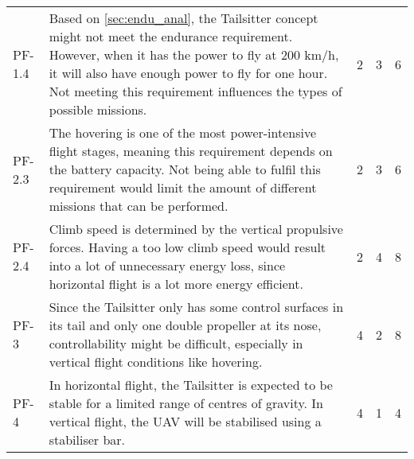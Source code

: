 \begin{table}[]
\begin{tabularx}{\textwidth}{l L l l l}
        \\ \hdashline
        PF-1.4          & Based on \autoref{sec:endu_anal}, the Tailsitter concept might not meet the endurance requirement. However, when it has the power to fly at 200 km/h, it will also have enough power to fly for one hour. Not meeting this requirement influences the types of possible missions.                         & 2     & 3     & 6      
        \\ \hdashline
        PF-2.3          & The hovering is one of the most power-intensive flight stages, meaning this requirement depends on the battery capacity. Not being able to fulfil this requirement would limit the amount of different missions that can be performed.                                                                    & 2       & 3 & 6
        \\ \hdashline
        PF-2.4          & Climb speed is determined by the vertical propulsive forces. Having a too low climb speed would result into a lot of unnecessary energy loss, since horizontal flight is a lot more energy efficient.               & 2   & 4   & 8
        \\ \hdashline
        PF-3            & Since the Tailsitter only has some control surfaces in its tail and only one double propeller at its nose, controllability might be difficult, especially in vertical flight conditions like hovering.                  & 4     & 2 & 8
        \\ \hdashline
        PF-4            & In horizontal flight, the Tailsitter is expected to be stable for a limited range of centres of gravity. In vertical flight, the UAV will be stabilised using a stabiliser bar.             & 4 & 1 & 4
        \\ \bottomrule
    \end{tabularx}
\end{table}



